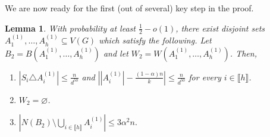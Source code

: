 \documentclass[notitlepage]{scrartcl}
\newcommand{\br}[1]{\llbracket{#1}\rrbracket}
\newtheorem{lemma}[thm]{Lemma}
\begin{document}
We are now ready for the first (out of several) key step in the proof.
\begin{lemma}\label{l: first LLL large degree}
With probability at least $\frac{1}{2}-o(1)$, there exist disjoint sets $A_1^{(1)},\ldots, A_h^{(1)}\subseteq V(G)$ which satisfy the following. Let $B_2=B\left(A_1^{(1)},\ldots, A_h^{(1)}\right)$ and let $W_2=W\left(A_1^{(1)},\ldots, A_h^{(1)}\right)$. Then,
\begin{enumerate}
    \item $\left|S_i\triangle A_i^{(1)}\right|\le \frac{n}{d^{50}}$ and $\left||A_i^{(1)}|-\frac{(1-\alpha)n}{k}\right|\le \frac{n}{d^{50}}$ for every $i\in \br{h}$.
    \item $W_2=\varnothing$.
    \item $\left|N(B_2)\setminus\bigcup_{i\in \br{h}} A_i^{(1)}\right|\le 3\alpha^2n.$
\end{enumerate}
\end{lemma}
\end{document}
